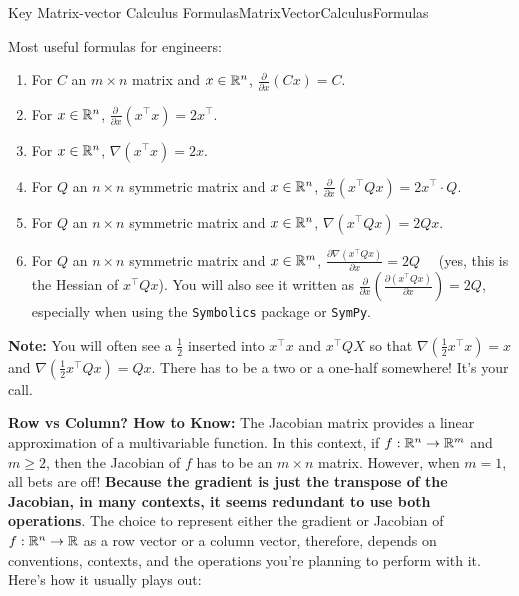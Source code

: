 \begin{propColor}{Key Matrix-vector Calculus Formulas}{MatrixVectorCalculusFormulas}

Most useful formulas for engineers: 
\begin{enumerate}
\renewcommand{\labelenumi}{(\alph{enumi})}
\setlength{\itemsep}{.2cm}
\item For $C$ an $m \times n$ matrix and $x \in \mathbb R^{n}$, $\frac{\partial }{\partial x} \left( C  x \right) = C$.

\item For $x \in \mathbb R^{n}$, $ \frac{\partial~ }{\partial x} \left(x^\top x\right) = 2 x ^\top $.

\item For $x \in \mathbb R^{n}$, $\nabla \left( x^\top x\right) = 2 x$.

\item For $Q$ an $n \times n$ symmetric matrix and $x \in \mathbb R^{n}$, $\frac{\partial }{\partial x} \left( x^\top Q x \right)= 2 x^\top \cdot Q $.

\item For $Q$ an $n \times n$ symmetric matrix and $x \in \mathbb R^{n}$, $\nabla  \left(x^\top Q  x \right) = 2 Q  x$.

\item For $Q$ an $n \times n$ symmetric matrix and $x \in \mathbb R^{m}$, $\frac{\partial \nabla \left(x^\top Q  x \right)}{\partial x}  = 2 Q$ ~~(yes, this is the Hessian of $x^\top Q x$). You will also see it written as 
$\frac{\partial }{\partial x} \left(\frac{\partial \left( x^\top Q x \right)}{\partial x}   \right) = 2 Q$, especially when using the \texttt{Symbolics} package or \texttt{SymPy}.

\end{enumerate}

\textbf{Note:} You will often see a $\frac{1}{2}$ inserted into $ x^\top x$ and $x^\top QX$ so that
$\nabla\left( \frac{1}{2} x^\top x \right) =x$ and $\nabla\left( \frac{1}{2} x^\top Qx \right) =Qx$. There has to be a two or a one-half somewhere! It's your call.
    
\end{propColor}

\vspace*{.2cm}

\textbf{Row vs Column? How to Know:}
The Jacobian matrix provides a linear approximation of a multivariable function. In this context, if \( f: \mathbb R^{n} \to \mathbb R^{m}\) and $m \ge 2$, then the Jacobian of \( f \) has to be an $m \times n$ matrix. However, when $m =1$, all bets are off! \textbf{Because the gradient is just the transpose of the Jacobian, in many contexts, it seems redundant to use both operations}. The choice to represent either the gradient or Jacobian of $f:\mathbb R^{n} \to \mathbb R$ as a row vector or a column vector, therefore, depends on conventions, contexts, and the operations you're planning to perform with it. Here's how it usually plays out:

